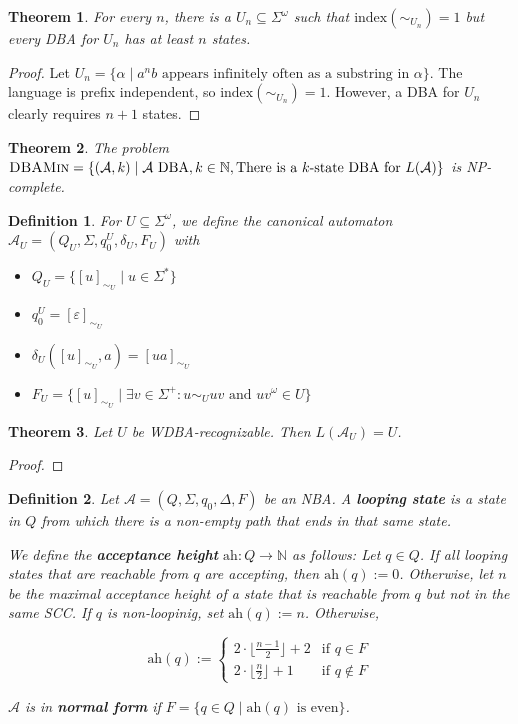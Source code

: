 \documentclass{article}
\newtheorem{theorem}{Theorem}[section]
\newtheorem{definition}{Definition}
\begin{document}
\begin{theorem}
	For every $n$, there is a $U_n \subseteq \Sigma^\omega$ such that $\text{index}(\sim_{U_n}) = 1$ but every DBA for $U_n$ has at least $n$ states.
\end{theorem}
\begin{proof}
	Let $U_n = \{\alpha \mid a^n b \text{ appears infinitely often as a substring in } \alpha \}$. The language is prefix independent, so $\text{index}(\sim_{U_n}) = 1$. However, a DBA for $U_n$ clearly requires $n+1$ states.
\end{proof}


\begin{theorem}
	The problem $\textsc{DBAMin} = \{ (\mathcal{A}, k) \mid \mathcal{A} \text{ DBA}, k \in \mathbb{N}, \text{There is a } k \text{-state DBA for } L(\mathcal{A}) \}$ is NP-complete.
\end{theorem}


\begin{definition}
	For $U \subseteq \Sigma^\omega$, we define the canonical automaton $\mathcal{A}_U = (Q_U, \Sigma, q_0^U, \delta_U, F_U)$ with 
	\begin{itemize}
		\item $Q_U = \{ [u]_{\sim_U} \mid u \in \Sigma^* \}$
		\item $q_0^U = [\varepsilon]_{\sim_U}$
		\item $\delta_U([u]_{\sim_U}, a) = [ua]_{\sim_U}$
		\item $F_U = \{ [u]_{\sim_U} \mid \exists v \in \Sigma^+: u \sim_U uv \text{ and } uv^\omega \in U\}$ 
	\end{itemize}
\end{definition}


\begin{theorem}
	Let $U$ be WDBA-recognizable. Then $L(\mathcal{A}_U) = U$.
\end{theorem}
\begin{proof}
\end{proof}


\begin{definition}
	Let $\mathcal{A} = (Q, \Sigma, q_0, \Delta, F)$ be an NBA. A \textbf{looping state} is a state in $Q$ from which there is a non-empty path that ends in that same state.
	
	We define the \textbf{acceptance height} $\text{ah} : Q \rightarrow \mathbb{N}$ as follows: Let $q \in Q$. If all looping states that are reachable from $q$ are accepting, then $\text{ah}(q) := 0$. Otherwise, let $n$ be the maximal acceptance height of a state that is reachable from $q$ but not in the same SCC. If $q$ is non-loopinig, set $\text{ah}(q) := n$. Otherwise, 
	
	$$ \text{ah}(q) := \begin{cases}
		2 \cdot \lfloor \frac{n-1}{2} \rfloor + 2  & \text{if } q \in F \\
		2 \cdot \lfloor \frac{n}{2} \rfloor + 1 & \text{if } q \notin F
	\end{cases} $$
	
	$\mathcal{A}$ is in \textbf{normal form} if $F = \{ q \in Q \mid \text{ah}(q) \text{ is even}\}$.
\end{definition}
\end{document}

